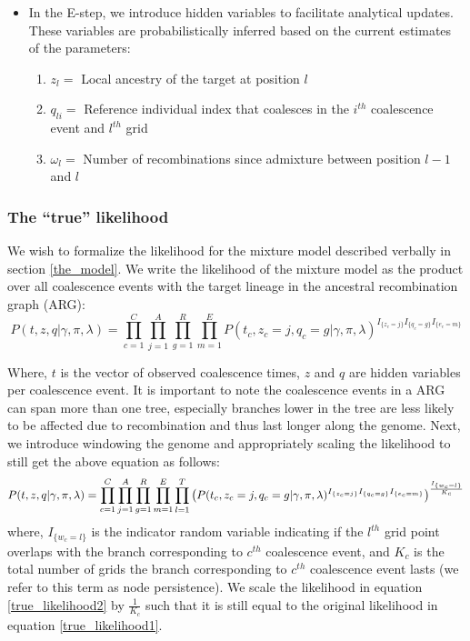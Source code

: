 \begin{itemize}
    \item In the E-step, we introduce hidden variables to facilitate analytical updates. These variables are probabilistically inferred based on the current estimates of the parameters:
    \begin{enumerate}
        \item $z_l =$ Local ancestry of the target at position $l$
        \item $q_{li} =$ Reference individual index that coalesces in the $i^{th}$ coalescence event and $l^{th}$ grid
        \item $\omega_l =$ Number of recombinations since admixture between position $l-1$ and $l$
    \end{enumerate}

\end{itemize}

\subsubsection{The ``true'' likelihood}
We wish to formalize the likelihood for the mixture model described verbally in section \ref{the_model}. We write the likelihood of the mixture model as the product over all coalescence events with the target lineage in the ancestral recombination graph (ARG): 
\begin{equation}
    P (t,z,q \vert \gamma, \pi, \lambda) = \prod_{c=1}^{C} \prod_{j = 1}^A \prod_{g =1}^{R} \prod_{m = 1}^E P (t_c,z_c = j,q_c=g \vert \gamma, \pi, \lambda)^{I_{\{z_c = j\}} I_{\{q_c = g\}} I_{\{e_c = m\}}}
\label{true_likelihood1}
\end{equation}

Where, $t$ is the vector of observed coalescence times, $z$ and $q$ are hidden variables per coalescence event. It is important to note the coalescence events in a ARG can span more than one tree, especially branches lower in the tree are less likely to be affected due to recombination and thus last longer along the genome. Next, we introduce windowing the genome and appropriately scaling the likelihood to still get the above equation as follows:
\begin{equation}
    \footnotesize
    P(t,z,q \vert \gamma, \pi, \lambda) = \prod_{c=1}^{C} \prod_{j = 1}^A \prod_{g =1}^{R} \prod_{m = 1}^E \prod_{l =1}^{T} \left( P(t_c,z_c = j,q_c=g \vert \gamma, \pi, \lambda)^{I_{\{z_c = j\}} I_{\{q_c = g\}} I_{\{e_c = m\}}} \right) ^{\frac{I_{\{w_c = l\}}}{K_c}}
\label{true_likelihood2}
\end{equation}
where, $I_{\{w_c = l\}}$ is the indicator random variable indicating if the $l^{th}$ grid point overlaps with the branch corresponding to $c^{th}$ coalescence event, and $K_c$ is the total number of grids the branch corresponding to $c^{th}$ coalescence event lasts (we refer to this term as node persistence). We scale the likelihood in equation \ref{true_likelihood2} by $\frac{1}{K_c}$ such that it is still equal to the original likelihood in equation \ref {true_likelihood1}. 


